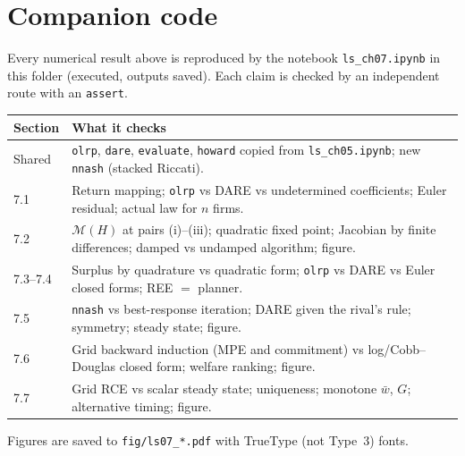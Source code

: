 \documentclass[12pt, letterpaper]{article}
\begin{document}
\section*{Companion code}

Every numerical result above is reproduced by the notebook \texttt{ls\_ch07.ipynb} in this folder
(executed, outputs saved). Each claim is checked by an independent route with an \texttt{assert}.

\begin{center}
\begin{tabular}{@{}lp{11.2cm}@{}}
\toprule
\textbf{Section} & \textbf{What it checks} \\
\midrule
Shared & \texttt{olrp}, \texttt{dare}, \texttt{evaluate}, \texttt{howard} copied from \texttt{ls\_ch05.ipynb}; new \texttt{nnash} (stacked Riccati). \\
7.1 & Return mapping; \texttt{olrp} vs DARE vs undetermined coefficients; Euler residual; actual law for $n$ firms. \\
7.2 & $\mathcal M(H)$ at pairs (i)--(iii); quadratic fixed point; Jacobian by finite differences; damped vs undamped algorithm; figure. \\
7.3--7.4 & Surplus by quadrature vs quadratic form; \texttt{olrp} vs DARE vs Euler closed forms; REE $=$ planner. \\
7.5 & \texttt{nnash} vs best-response iteration; DARE given the rival's rule; symmetry; steady state; figure. \\
7.6 & Grid backward induction (MPE and commitment) vs log/Cobb--Douglas closed form; welfare ranking; figure. \\
7.7 & Grid RCE vs scalar steady state; uniqueness; monotone $\bar w$, $G$; alternative timing; figure. \\
\bottomrule
\end{tabular}
\end{center}

Figures are saved to \texttt{fig/ls07\_*.pdf} with TrueType (not Type~3) fonts.
\end{document}
